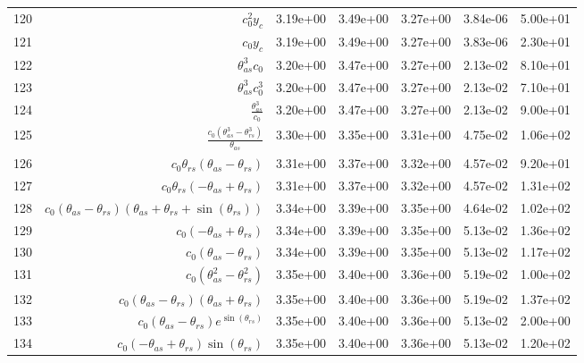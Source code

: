\begin{tabularx}{\textwidth}{lRRRRRl}
120  &  $ c_{0}^{2} y_c $  &  3.19e+00  &  3.49e+00  &  3.27e+00  &  3.84e-06  &  5.00e+01  \\ 
121  &  $ c_{0} y_c $  &  3.19e+00  &  3.49e+00  &  3.27e+00  &  3.83e-06  &  2.30e+01  \\ 
122  &  $ \theta_{as}^{3} c_{0} $  &  3.20e+00  &  3.47e+00  &  3.27e+00  &  2.13e-02  &  8.10e+01  \\ 
123  &  $ \theta_{as}^{3} c_{0}^{3} $  &  3.20e+00  &  3.47e+00  &  3.27e+00  &  2.13e-02  &  7.10e+01  \\ 
124  &  $ \displaystyle\frac{\theta_{as}^{3}}{c_{0}} $  &  3.20e+00  &  3.47e+00  &  3.27e+00  &  2.13e-02  &  9.00e+01  \\ 
125  &  $ \displaystyle\frac{c_{0} \left(\theta_{as}^{3} - \theta_{rs}^{3}\right)}{\theta_{as}} $  &  3.30e+00  &  3.35e+00  &  3.31e+00  &  4.75e-02  &  1.06e+02  \\ 
126  &  $ c_{0} \theta_{rs} \left(\theta_{as} - \theta_{rs}\right) $  &  3.31e+00  &  3.37e+00  &  3.32e+00  &  4.57e-02  &  9.20e+01  \\ 
127  &  $ c_{0} \theta_{rs} \left(- \theta_{as} + \theta_{rs}\right) $  &  3.31e+00  &  3.37e+00  &  3.32e+00  &  4.57e-02  &  1.31e+02  \\ 
128  &  $ c_{0} \left(\theta_{as} - \theta_{rs}\right) \left(\theta_{as} + \theta_{rs} + \sin{\left(\theta_{rs} \right)}\right) $  &  3.34e+00  &  3.39e+00  &  3.35e+00  &  4.64e-02  &  1.02e+02  \\ 
129  &  $ c_{0} \left(- \theta_{as} + \theta_{rs}\right) $  &  3.34e+00  &  3.39e+00  &  3.35e+00  &  5.13e-02  &  1.36e+02  \\ 
130  &  $ c_{0} \left(\theta_{as} - \theta_{rs}\right) $  &  3.34e+00  &  3.39e+00  &  3.35e+00  &  5.13e-02  &  1.17e+02  \\ 
131  &  $ c_{0} \left(\theta_{as}^{2} - \theta_{rs}^{2}\right) $  &  3.35e+00  &  3.40e+00  &  3.36e+00  &  5.19e-02  &  1.00e+02  \\ 
132  &  $ c_{0} \left(\theta_{as} - \theta_{rs}\right) \left(\theta_{as} + \theta_{rs}\right) $  &  3.35e+00  &  3.40e+00  &  3.36e+00  &  5.19e-02  &  1.37e+02  \\ 
133  &  $ c_{0} \left(\theta_{as} - \theta_{rs}\right) e^{\sin{\left(\theta_{rs} \right)}} $  &  3.35e+00  &  3.40e+00  &  3.36e+00  &  5.13e-02  &  2.00e+00  \\ 
134  &  $ c_{0} \left(- \theta_{as} + \theta_{rs}\right) \sin{\left(\theta_{rs} \right)} $  &  3.35e+00  &  3.40e+00  &  3.36e+00  &  5.13e-02  &  1.20e+02  \\ 

\end{tabularx}
